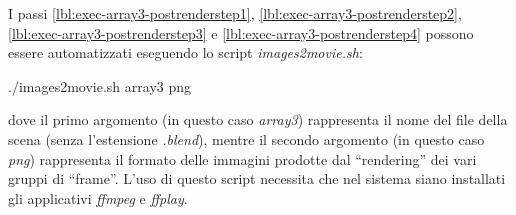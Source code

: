 I passi \ref{lbl:exec-array3-postrenderstep1}, \ref{lbl:exec-array3-postrenderstep2}, \ref{lbl:exec-array3-postrenderstep3} e \ref{lbl:exec-array3-postrenderstep4} possono essere automatizzati eseguendo lo script \emph{images2movie.sh}:
\begin{mgCodeBox}
./images2movie.sh array3 png
\end{mgCodeBox}
dove il primo argomento (in questo caso \emph{array3}) rappresenta il nome del file della scena (senza l'estensione \emph{.blend}), mentre il secondo argomento (in questo caso \emph{png}) rappresenta il formato delle immagini prodotte dal ``rendering'' dei vari gruppi di ``frame''.
L'uso di questo script necessita che nel sistema siano installati gli applicativi \emph{ffmpeg} e \emph{ffplay}.

